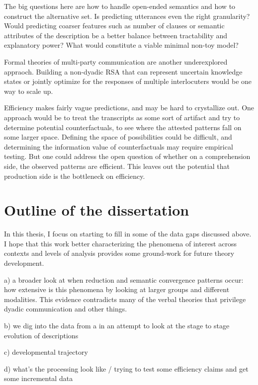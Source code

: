 \documentclass[]{article}
\begin{document}
	The big questions here are how to handle open-ended semantics and how to construct the alternative set. Is predicting utterances even the right granularity? Would predicting coarser features such as number of clauses or semantic attributes of the description be a better balance between tractability and explanatory power? What would constitute a viable minimal  non-toy model? 
	
	Formal theories of multi-party communication are another underexplored appraoch. Building a non-dyadic RSA that can represent uncertain knowledge states or jointly optimize for the responses of multiple interlocuters would be one way to scale up. 
	
	Efficiency makes fairly vague predictions, and may be hard to crystallize out. One approach would be to treat the transcripts as some sort of artifact and try to determine potential counterfactuals, to see where the attested patterns fall on some larger space. Defining the space of possibilities could be difficult, and determining the information value of counterfactuals may require empirical testing. But one could address the open question of whether on a comprehension side, the observed patterns are efficient. This leaves out the potential that production side is the bottleneck on efficiency.  
	
	
	\section{Outline of the dissertation}
	
	
	
	In this thesis, I focus on starting to fill in some of the data gaps discussed above. I hope that this work better characterizing the phenomena of interest across contexts and levels of analysis provides some ground-work for future theory development. 

	a) a broader look at when reduction and semantic convergence patterns occur: how extensive is this phenomena by looking at larger groups and different modalities. This evidence contradicts many of the verbal theories that privilege dyadic communication and other things. 
	
	b) we dig into the data from a in an attempt to look at the stage to stage evolution of descriptions
	
	c) developmental trajectory
	
	d) what's the processing look like / trying to test some efficiency claims and get some incremental data
	
\end{document}
